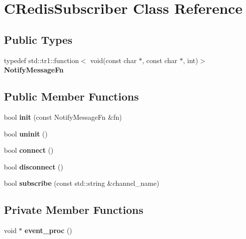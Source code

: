 \hypertarget{classCRedisSubscriber}{}\section{C\+Redis\+Subscriber Class Reference}
\label{classCRedisSubscriber}
\subsection*{Public Types}
\begin{DoxyCompactItemize}
\item 
\mbox{\label{classCRedisSubscriber_aed46e92256f595ea9e6198b64aa3be84}} 
typedef std\+::tr1\+::function$<$ void(const char $\ast$, const char $\ast$, int)$>$ {\bfseries Notify\+Message\+Fn}
\end{DoxyCompactItemize}
\subsection*{Public Member Functions}
\begin{DoxyCompactItemize}
\item 
\mbox{\label{classCRedisSubscriber_afef590bbd6fde34b17089d401ef4dac5}} 
bool {\bfseries init} (const Notify\+Message\+Fn \&fn)
\item 
\mbox{\label{classCRedisSubscriber_a12ff40e571587e147e5049ca25e0d2bc}} 
bool {\bfseries uninit} ()
\item 
\mbox{\label{classCRedisSubscriber_a4a5cfff21256fd1b87410f91f5a41595}} 
bool {\bfseries connect} ()
\item 
\mbox{\label{classCRedisSubscriber_ad6a929b69868697ec06d5eb97d58c84c}} 
bool {\bfseries disconnect} ()
\item 
\mbox{\label{classCRedisSubscriber_a6f39a0e6070a25263a72373ee84ac1ba}} 
bool {\bfseries subscribe} (const std\+::string \&channel\+\_\+name)
\end{DoxyCompactItemize}
\subsection*{Private Member Functions}
\begin{DoxyCompactItemize}
\item 
\mbox{\label{classCRedisSubscriber_a348b74323ec1771429631b7bbf4226c6}} 
void $\ast$ {\bfseries event\+\_\+proc} ()
\end{DoxyCompactItemize}
